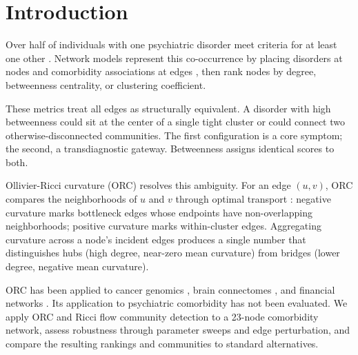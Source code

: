 \documentclass{article}
\begin{document}
\section{Introduction}

Over half of individuals with one psychiatric disorder meet criteria for at least one other \citep{kessler2005prevalence}. Network models represent this co-occurrence by placing disorders at nodes and comorbidity associations at edges \citep{borsboom2017network, fried2017mental}, then rank nodes by degree, betweenness centrality, or clustering coefficient.

These metrics treat all edges as structurally equivalent. A disorder with high betweenness could sit at the center of a single tight cluster or could connect two otherwise-disconnected communities. The first configuration is a core symptom; the second, a transdiagnostic gateway. Betweenness assigns identical scores to both.

Ollivier-Ricci curvature (ORC) resolves this ambiguity. For an edge $(u, v)$, ORC compares the neighborhoods of $u$ and $v$ through optimal transport \citep{ollivier2009ricci}: negative curvature marks bottleneck edges whose endpoints have non-overlapping neighborhoods; positive curvature marks within-cluster edges. Aggregating curvature across a node's incident edges produces a single number that distinguishes hubs (high degree, near-zero mean curvature) from bridges (lower degree, negative mean curvature).

ORC has been applied to cancer genomics \citep{sandhu2015graph}, brain connectomes \citep{ni2015ricci}, and financial networks \citep{sandhu2016ricci}. Its application to psychiatric comorbidity has not been evaluated. We apply ORC and Ricci flow community detection to a 23-node comorbidity network, assess robustness through parameter sweeps and edge perturbation, and compare the resulting rankings and communities to standard alternatives.
\end{document}
